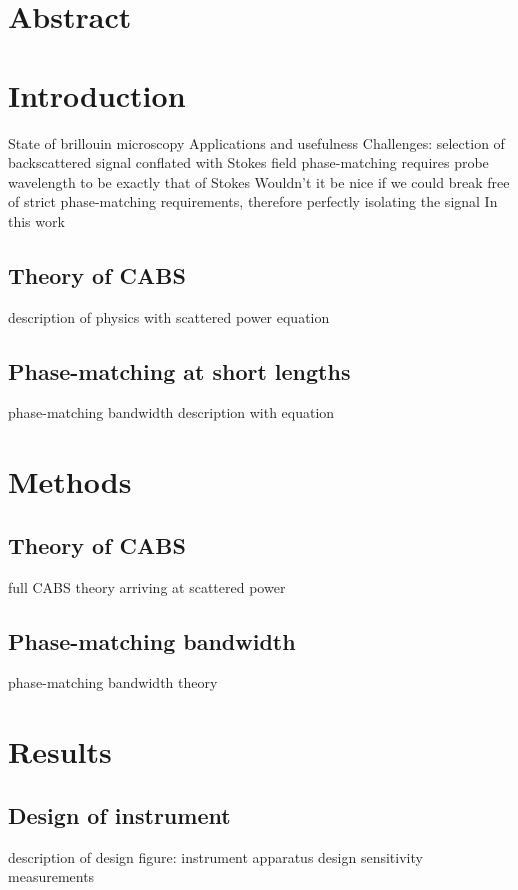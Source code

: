
\section{Abstract}

\section{Introduction}
State of brillouin microscopy
Applications and usefulness
Challenges: selection of backscattered signal
  conflated with Stokes field
  phase-matching requires probe wavelength to be exactly that of Stokes
Wouldn't it be nice if we could break free of strict phase-matching requirements, therefore perfectly isolating the signal
In this work

  \subsection{Theory of CABS}
  description of physics with scattered power equation

  \subsection{Phase-matching at short lengths}
  phase-matching bandwidth description with equation

\section{Methods} %

  \subsection{Theory of CABS}
  full CABS theory arriving at scattered power

  \subsection{Phase-matching bandwidth}
  phase-matching bandwidth theory

\section{Results}

  \subsection{Design of instrument}
  description of design
  figure: instrument
    apparatus design
    sensitivity measurements


